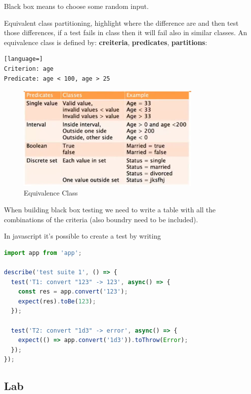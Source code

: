\documentclass[12pt]{article}
\begin{document}
Black box means to choose some random input.

Equivalent class partitioning, highlight where the difference are and then test those differences, if a test fails in class then it will fail also in similar classes. An equivalence class is defined by: \textbf{creiteria}, \textbf{predicates}, \textbf{partitions}:
\begin{lstlisting}[language=]
Criterion: age
Predicate: age < 100, age > 25
\end{lstlisting}
\begin{figure}[H]
  \centering
  \includegraphics[width=0.8\textwidth]{equivalence-class.png}
  \caption{Equivalence Class}
  \label{fig:equivalence-class}
\end{figure}
When building black box testing we need to write a table with all the combinations of the criteria (also boundry need to be included).



In javascript it's possible to create a test by writing
\begin{lstlisting}[language=js]
import app from 'app';

describe('test suite 1', () => {
  test('T1: convert "123" -> 123', async() => {
    const res = app.convert('123');
    expect(res).toBe(123);
  });

  test('T2: convert "1d3" -> error', async() => {
    expect(() => app.convert('1d3')).toThrow(Error);
  });
});
\end{lstlisting}



\subsection{Lab}
\end{document}

